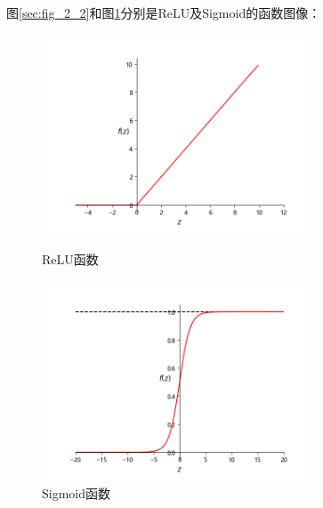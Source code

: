 图\ref{sec:fig_2_2}和图\ref{sec:fig_2_3}分别是ReLU及Sigmoid的函数图像：
\begin{figure}[htbp]
	\centering
	\begin{minipage}[t]{0.48\textwidth}
		\centering
		\includegraphics[width=8cm]{figures/chapter_2/fig_2_2.png}
		\caption{ReLU函数}\label{sec:fig_2_2}
	\end{minipage}
	\begin{minipage}[t]{0.48\textwidth}
		\centering
		\includegraphics[width=8cm]{figures/chapter_2/fig_2_3.png}
		\caption{Sigmoid函数}\label{sec:fig_2_3}
	\end{minipage}
\end{figure}

